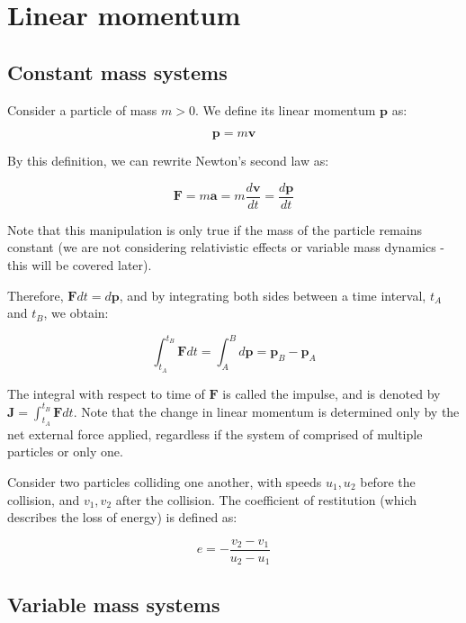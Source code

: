 \documentclass[12pt]{article}
\begin{document}
\section{Linear momentum}

\subsection{Constant mass systems}

\begin{definition}
    Consider a particle of mass $m > 0$. We define its linear momentum $\mathbf{p}$ as:

    \[ \mathbf{p} = m\mathbf{v} \]
\end{definition}

By this definition, we can rewrite Newton's second law as:

\[ \mathbf{F} = m\mathbf{a} = m\frac{d\mathbf{v}}{dt} = \frac{d\mathbf{p}}{dt} \]

Note that this manipulation is only true if the mass of the particle remains constant (we are not considering relativistic effects or variable mass dynamics - this will be covered later).

Therefore, $\mathbf{F}dt = d\mathbf{p}$, and by integrating both sides between a time interval, $t_A$ and $t_B$, we obtain:

\[ \int_{t_A}^{t_B} \mathbf{F}dt = \int_A^B d\mathbf{p} = \mathbf{p}_B - \mathbf{p}_A \]

The integral with respect to time of $\mathbf{F}$ is called the impulse, and is denoted by $\mathbf{J} = \int_{t_A}^{t_B} \mathbf{F}dt$. Note that the change in linear momentum is determined only by the net external force applied, regardless if the system of comprised of multiple particles or only one.

\begin{definition}
    Consider two particles colliding one another, with speeds $u_1, u_2$ before the collision, and $v_1, v_2$ after the collision. The coefficient of restitution (which describes the loss of energy) is defined as:

    \[ e = - \frac{v_2 - v_1}{u_2 - u_1} \]
\end{definition}

\subsection{Variable mass systems}
\end{document}
